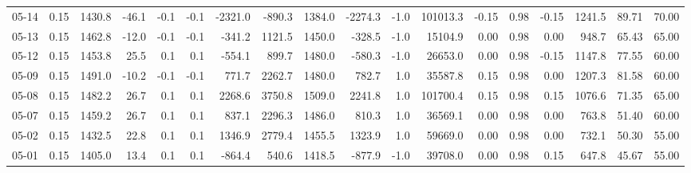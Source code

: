 \begin{threeparttable}
{\begin{tabular}{lrrrrrrrrrrrrrrrrr}
  05-14 &     0.15 & 1430.8 &             -46.1 &              -0.1 &               -0.1 &            -2321.0 &  -890.3 & 1384.0 &    -2274.3 &                     -1.0 &            101013.3 &      -0.15 &      0.98 &          -0.15 &           1241.5 &           89.71 &                  70.00 \\
  05-13 &     0.15 & 1462.8 &             -12.0 &              -0.1 &               -0.1 &             -341.2 &  1121.5 & 1450.0 &     -328.5 &                     -1.0 &             15104.9 &       0.00 &      0.98 &           0.00 &            948.7 &           65.43 &                  65.00 \\
  05-12 &     0.15 & 1453.8 &              25.5 &               0.1 &                0.1 &             -554.1 &   899.7 & 1480.0 &     -580.3 &                     -1.0 &             26653.0 &       0.00 &      0.98 &          -0.15 &           1147.8 &           77.55 &                  60.00 \\
  05-09 &     0.15 & 1491.0 &             -10.2 &              -0.1 &               -0.1 &              771.7 &  2262.7 & 1480.0 &      782.7 &                      1.0 &             35587.8 &       0.15 &      0.98 &           0.00 &           1207.3 &           81.58 &                  60.00 \\
  05-08 &     0.15 & 1482.2 &              26.7 &               0.1 &                0.1 &             2268.6 &  3750.8 & 1509.0 &     2241.8 &                      1.0 &            101700.4 &       0.15 &      0.98 &           0.15 &           1076.6 &           71.35 &                  65.00 \\
  05-07 &     0.15 & 1459.2 &              26.7 &               0.1 &                0.1 &              837.1 &  2296.3 & 1486.0 &      810.3 &                      1.0 &             36569.1 &       0.00 &      0.98 &           0.00 &            763.8 &           51.40 &                  60.00 \\
  05-02 &     0.15 & 1432.5 &              22.8 &               0.1 &                0.1 &             1346.9 &  2779.4 & 1455.5 &     1323.9 &                      1.0 &             59669.0 &       0.00 &      0.98 &           0.00 &            732.1 &           50.30 &                  55.00 \\
  05-01 &     0.15 & 1405.0 &              13.4 &               0.1 &                0.1 &             -864.4 &   540.6 & 1418.5 &     -877.9 &                     -1.0 &             39708.0 &       0.00 &      0.98 &           0.15 &            647.8 &           45.67 &                  55.00 \\

\end{tabular}}
\end{threeparttable}
